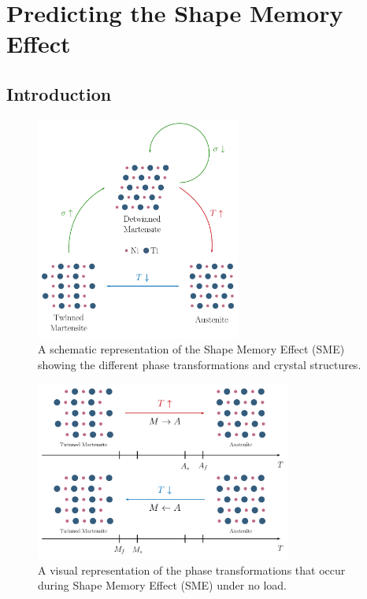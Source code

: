 
\chapter{Predicting the Shape Memory Effect}\label{chap:sma-model}
\section{Introduction}
\begin{figure}[hbt]
    \centering
    \includegraphics[width=0.6\textwidth]{images/chap2/sma-phases.pdf}
    \caption{A schematic representation of the Shape Memory Effect (SME) showing the different phase transformations and crystal structures.}
    \label{fig:sma-phases}
\end{figure}

\begin{figure}[hbt]
    \centering
    \includegraphics[width=0.75\textwidth]{images/chap2/sma-phase-transformations.pdf}
    \caption{A visual representation of the phase transformations that occur during Shape Memory Effect (SME) under no load.}
    \label{fig:sma-phase-transformations}
\end{figure}

